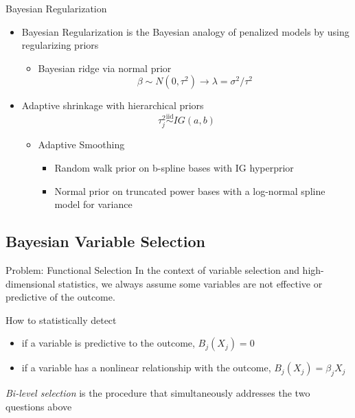 \documentclass[
  ignorenonframetext,
  aspectratio=169]{beamer}
\providecommand{\tightlist}{%
  \setlength{\itemsep}{0pt}\setlength{\parskip}{0pt}}
\newcommand{\simiid}{\overset{\text{iid}}{\sim}}
\begin{document}
\begin{frame}{Bayesian Regularization}
\protect\hypertarget{bayesian-regularization-1}{}
\begin{itemize}
\tightlist
\item
  Bayesian Regularization is the Bayesian analogy of penalized models by
  using regularizing priors

  \begin{itemize}
  \tightlist
  \item
    Bayesian ridge via normal prior \[
     \beta \sim N(0, \tau^2) \rightarrow  \lambda = \sigma^2/\tau^2
    \]
  \end{itemize}
\item
  Adaptive shrinkage with hierarchical priors \[
   \tau^2_j \simiid IG(a, b)
  \]

  \begin{itemize}
  \tightlist
  \item
    Adaptive Smoothing

    \begin{itemize}
    \tightlist
    \item
      Random walk prior on b-spline bases with IG hyperprior
    \item
      Normal prior on truncated power bases with a log-normal spline
      model for variance
    \end{itemize}
  \end{itemize}
\end{itemize}
\end{frame}

\hypertarget{bayesian-variable-selection}{%
\subsection{Bayesian Variable
Selection}\label{bayesian-variable-selection}}

\begin{frame}{Problem: Functional Selection}
\protect\hypertarget{problem-functional-selection}{}
In the context of variable selection and high-dimensional statistics, we
always assume some variables are not effective or predictive of the
outcome.

\begin{tcolorbox}[colback=green!5,colframe=green!40!black,title=Question]
How to statistically detect
  \begin{itemize}
    \item if a variable is predictive to the outcome, $B_j(X_j) = 0$
    \item if a variable has a nonlinear relationship with the outcome, $B_j(X_j) = \beta_j X_j$
  \end{itemize}
\end{tcolorbox}

\emph{Bi-level selection} is the procedure that simultaneously addresses
the two questions above
\end{frame}
\end{document}
